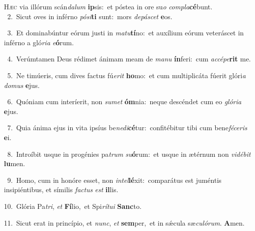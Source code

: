 \lettrine{\initial\textcolor{\initialcolor}{H}}{æc} via illórum scán\-\textit{da}\-\textit{lum} \textbf{ip}\-sis:~\star et póstea in ore su\textit{o} \textit{com}\-\textit{pla}\textbf{cé}bunt.\\
{\numbfont\textcolor{\numbcolor}{~2.}}~Sicut oves in inférno \textit{pó}\-\textit{si}\textbf{ti} sunt:~\star mors \textit{de}\-\textit{pá}\textit{scet} \textbf{e}\-os.\par
{\numbfont\textcolor{\numbcolor}{~3.}}~Et dominabúntur eórum justi in \textit{ma}\-\textit{tu}\textbf{tí}no:~\star et auxílium eórum veteráscet in inférno a gló\-\textit{ri}\-\textit{a} \textit{e}\-\textbf{ó}rum.\par
{\numbfont\textcolor{\numbcolor}{~4.}}~Verúmtamen Deus rédimet ánimam meam de \textit{ma}\-\textit{nu} \textbf{ín}\-feri:~\star cum \textit{ac}\-\textit{cé}\textit{pe}\textbf{rit} me.\par
{\numbfont\textcolor{\numbcolor}{~5.}}~Ne timúeris, cum dives factus fú\-\textit{e}\-\textit{rit} \textbf{ho}\-mo:~\star et cum multiplicáta fúerit glóri\textit{a} \textit{do}\-\textit{mus} \textbf{e}\-jus.\par
{\numbfont\textcolor{\numbcolor}{~6.}}~Quóniam cum interíerit, non \textit{su}\-\textit{met} \textbf{óm}\-nia:~\star neque descéndet cum eo \textit{gló}\-\textit{ri}\textit{a} \textbf{e}\-jus.\par
{\numbfont\textcolor{\numbcolor}{~7.}}~Quia ánima ejus in vita ipsíus be\-\textit{ne}\-\textit{di}\textbf{cé}tur:~\star confitébitur tibi cum bene\-\textit{fé}\-\textit{ce}\textit{ris} \textbf{e}\-i.\par
{\numbfont\textcolor{\numbcolor}{~8.}}~Introíbit usque in progénies pa\textit{trum} \textit{su}\-\textbf{ó}rum:~\star et usque in ætérnum non \textit{vi}\-\textit{dé}\textit{bit} \textbf{lu}\-men.\par
{\numbfont\textcolor{\numbcolor}{~9.}}~Homo, cum in honóre esset, non \textit{in}\-\textit{tel}\textbf{lé}xit:~\star comparátus est juméntis insipiéntibus, et símilis \textit{fac}\-\textit{tus} \textit{est} \textbf{il}\-lis.\par
{\numbfont\textcolor{\numbcolor}{10.}}~Glória Pa\-\textit{tri}\-, \textit{et} \textbf{Fí}\-lio,~\star et Spi\-\textit{rí}\-\textit{tu}\textit{i} \textbf{Sanc}\-to.\par
{\numbfont\textcolor{\numbcolor}{11.}}~Sicut erat in princípio, et \textit{nunc}\-, \textit{et} \textbf{sem}\-per,~\star et in sǽcula sæ\-\textit{cu}\-\textit{ló}\textit{rum}. \textbf{A}\-men.\par

